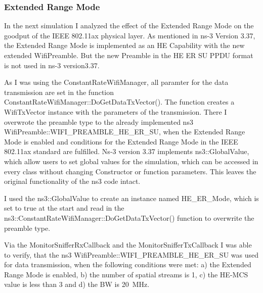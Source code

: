 \subsubsection*{Extended Range Mode}

In the next simulation I analyzed the effect of the Extended Range Mode on the goodput of the IEEE 802.11ax physical layer.
As mentioned in ns-3 Version 3.37, the Extended Range Mode is implemented as an HE Capability with the new extended WifiPreamble.
But the new Preamble in the HE ER SU PPDU format is not used in ns-3 version3.37.

As I was using the ConstantRateWifiManager, all paramter  for the data transmission are set in the function
ConstantRateWifiManager::DoGetDataTxVector(). The function creates a WifiTxVector instance with the parameters of the
transmission. There I overwrote the preamble type to the already implemented ns3 WifiPreamble::WIFI\_PREAMBLE\_HE\_ER\_SU, when
the Extended Range Mode is enabled and conditions for the Extended Range Mode in the IEEE 802.11ax standard \cite{noauthor_ieee_2021} are fulfilled.
Ns-3 version 3.37 implements ns3::GlobalValue, which allow users to set global values for the simulation, which can be accessed
in every class without changing Constructor or function parameters. This leaves the original functionality of the ns3 code
intact.

I used the ns3::GlobalValue to create an instance named HE\_ER\_Mode, which is set to true at the start and read in the ns3::ConstantRateWifiManager::DoGetDataTxVector() function
to overwrite the preamble type.

Via the MonitorSnifferRxCallback and the MonitorSnifferTxCallback I was able to verify, that the ns3 WifiPreamble::WIFI\_PREAMBLE\_HE\_ER\_SU was used
for data transmission, when the following conditions were met: a) the Extended Range Mode is enabled, b) the number of spatial streams is \num{1}, c) the HE-\ac{MCS} value is less than \num{3} and
d) the \ac{BW} is \SI{20}{\mega\hertz}.

